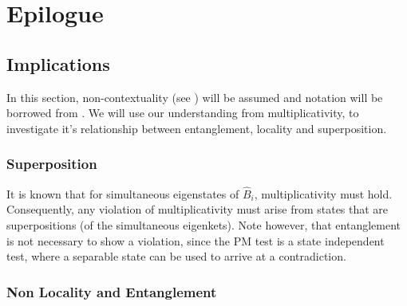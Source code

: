 %

\chapter{Epilogue}


\section{Implications}

In this section, non-contextuality (see )
will be assumed and notation will be borrowed from .
We will use our understanding from multiplicativity, to investigate
it's relationship between entanglement, locality and superposition. 


\subsection{Superposition}

It is known that for simultaneous eigenstates of $\hat{B}_{i}$, multiplicativity
must hold. Consequently, any violation of multiplicativity must arise
from states that are superpositions (of the simultaneous eigenkets).
Note however, that entanglement is not necessary to show a violation,
since the PM test is a state independent test, where a separable state
can be used to arrive at a contradiction. 


\subsection{Non Locality and Entanglement}

